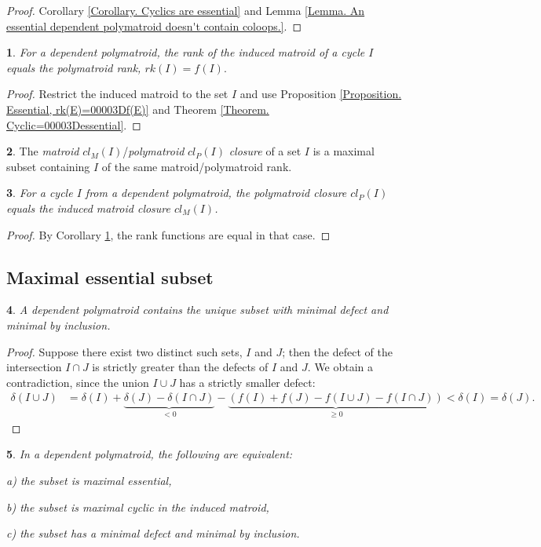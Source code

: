\documentclass[11pt]{article}
\theoremstyle{plain}
\newtheorem{thm}{\protect\theoremname}[section]
\theoremstyle{definition}
\newtheorem{defn}[thm]{\protect\definitionname}
\theoremstyle{remark}
\theoremstyle{plain}
\theoremstyle{plain}
\newtheorem{prop}[thm]{\protect\propositionname}
\theoremstyle{plain}
\newtheorem{cor}[thm]{\protect\corollaryname}
\theoremstyle{definition}
\providecommand{\corollaryname}{Corollary}
\providecommand{\definitionname}{Definition}
\providecommand{\propositionname}{Proposition}
\providecommand{\theoremname}{Theorem}
\begin{document}
\begin{proof}
Corollary \ref{Corollary. Cyclics are essential} and Lemma \ref{Lemma. An essential dependent polymatroid doesn't contain coloops.}.
\end{proof}
\begin{cor}
\label{Corollary. cyclic, rk(I)=00003Df(I)}For a dependent polymatroid,
the rank of the induced matroid of a cycle $I$ equals the polymatroid
rank, $rk(I)=f(I).$
\end{cor}

\begin{proof}
Restrict the induced matroid to the set $I$ and use Proposition \ref{Proposition. Essential, rk(E)=00003Df(E)}
and Theorem \ref{Theorem. Cyclic=00003Dessential}.
\end{proof}
\begin{defn}
The \textit{matroid} $cl_{M}(I)$/\textit{polymatroid} $cl_{P}(I)$
\textit{closure} of a set $I$ is a maximal subset containing $I$
of the same matroid/polymatroid rank.
\end{defn}

\begin{cor}
\label{Corollary. Cyclic, two closures are equal}For a cycle $I$
from a dependent polymatroid, the polymatroid closure $cl_{P}(I)$
equals the induced matroid closure $cl_{M}(I)$.
\end{cor}

\begin{proof}
By Corollary \ref{Corollary. cyclic, rk(I)=00003Df(I)}, the rank
functions are equal in that case.
\end{proof}

\subsection{Maximal essential subset}
\begin{prop}
\label{Proposition. Unique minimal subset of the minimal defect}A
dependent polymatroid contains the unique subset with minimal defect
and minimal by inclusion.
\end{prop}

\begin{proof}
Suppose there exist two distinct such sets, $I$ and $J$; then the
defect of the intersection $I\cap J$ is strictly greater than the
defects of $I$ and $J$. We obtain a contradiction, since the union
$I\cup J$ has a strictly smaller defect:
\begin{align*}
\delta(I\cup J) & =\delta(I)+\underbrace{\delta(J)-\delta(I\cap J)}_{<0}-\underbrace{(f(I)+f(J)-f(I\cup J)-f(I\cap J))}_{\geq0}<\delta(I)=\delta(J).
\end{align*}
\end{proof}
\begin{thm}
\label{Theorem. Maximal essential =00003D minimal defect}In a dependent
polymatroid, the following are equivalent:

a) the subset is maximal essential,

b) the subset is maximal cyclic in the induced matroid,

c) the subset has a minimal defect and minimal by inclusion.
\end{thm}
\end{document}
